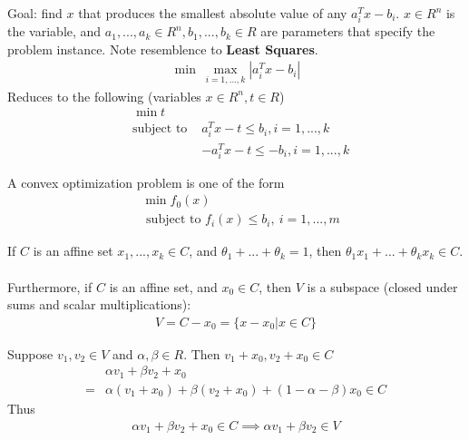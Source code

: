 \documentclass{article}
\begin{document}
\begin{definition}
  Goal: find $x$ that produces the smallest absolute value of any $a_i^Tx-b_i$.
  $x\in R^n$ is the variable, and $a_1,...,a_k\in R^n,b_1,...,b_k\in R$ are
  parameters that specify the problem instance.  Note resemblence to \textbf{Least Squares}.
  \begin{align}
    \min~\max_{i=1,...,k}|a_i^Tx-b_i|
  \end{align}
  \vpush
  Reduces to the following (variables $x\in R^n,t\in R$)
  \begin{align}
     & \min t                                            \\
    \nonumber
     & \text{subject to } & a_i^Tx-t\leq b_i,i=1,...,k   \\
    \nonumber
     &                    & -a_i^Tx-t\leq -b_i,i=1,...,k
  \end{align}
\end{definition}
\begin{definition}
  A convex optimization problem is one of the form
  \begin{align}
     & \min f_0(x)                                  \\
    \nonumber
     & \text{ subject to }f_i(x)\leq b_i,~i=1,...,m
  \end{align}
\end{definition}
\begin{theorem}
  If $C$ is an affine set $x_1,...,x_k\in C$, and $\theta_1+...+\theta_k=1$,
  then $\theta_1x_1+...+\theta_kx_k\in C$.\\ \\
  Furthermore, if $C$ is an affine set, and $x_0\in C$, then $V$ is a subspace
  (closed under sums and scalar multiplications):
  \begin{align}
    V=C-x_0=\{x-x_0|x\in C\}
  \end{align}
\end{theorem}
\begin{headered_note}[Proof]
  Suppose $v_1,v_2\in V$ and $\alpha,\beta\in R$.  Then $v_1+x_0,v_2+x_0\in C$
  \begin{align*}
      & \alpha v_1+\beta v_2+x_0                                \\
    = & \alpha(v_1+x_0)+\beta(v_2+x_0)+(1-\alpha-\beta)x_0\in C
  \end{align*}
  Thus
  \begin{align}
    \alpha v_1+\beta v_2+x_0\in C\implies \alpha v_1+\beta v_2\in V
  \end{align}
\end{headered_note}
\end{document}
